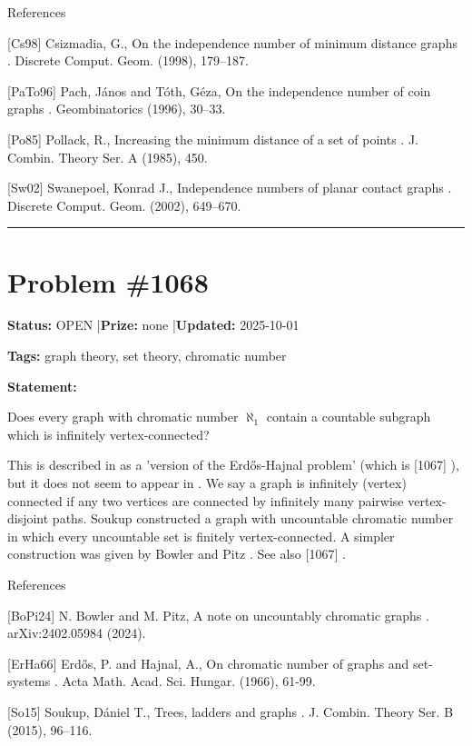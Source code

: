 \documentclass{article}
\begin{document}
References

[Cs98] Csizmadia, G., On the independence number of minimum distance graphs . Discrete Comput. Geom. (1998), 179--187.

[PaTo96] Pach, J\'{a}nos and T\'oth, G\'{e}za, On the independence number of coin graphs . Geombinatorics (1996), 30--33.

[Po85] Pollack, R., Increasing the minimum distance of a set of points . J. Combin. Theory Ser. A (1985), 450.

[Sw02] Swanepoel, Konrad J., Independence numbers of planar contact graphs . Discrete Comput. Geom. (2002), 649--670.

\noindent\rule{\linewidth}{0.4pt}


\section{Problem \#1068}
\label{prob:1068}

\noindent\textbf{Status:} OPEN \quad|\quad \textbf{Prize:} none \quad|\quad \textbf{Updated:} 2025-10-01

\noindent\textbf{Tags:} graph theory, set theory, chromatic number

\medskip

\noindent\textbf{Statement:}

Does every graph with chromatic number $\aleph_1$ contain a countable subgraph which is infinitely vertex-connected?




This is described in \cite{BoPi24} as a 'version of the Erd\H{o}s-Hajnal problem' (which is [1067] ), but it does not seem to appear in \cite{ErHa66}. We say a graph is infinitely (vertex) connected if any two vertices are connected by infinitely many pairwise vertex-disjoint paths. Soukup \cite{So15} constructed a graph with uncountable chromatic number in which every uncountable set is finitely vertex-connected. A simpler construction was given by Bowler and Pitz \cite{BoPi24}. See also [1067] .




References

[BoPi24] N. Bowler and M. Pitz, A note on uncountably chromatic graphs . arXiv:2402.05984 (2024).

[ErHa66] Erd\H{o}s, P. and Hajnal, A., On chromatic number of graphs and set-systems . Acta Math. Acad. Sci. Hungar. (1966), 61-99.

[So15] Soukup, D\'{a}niel T., Trees, ladders and graphs . J. Combin. Theory Ser. B (2015), 96--116.
\end{document}
